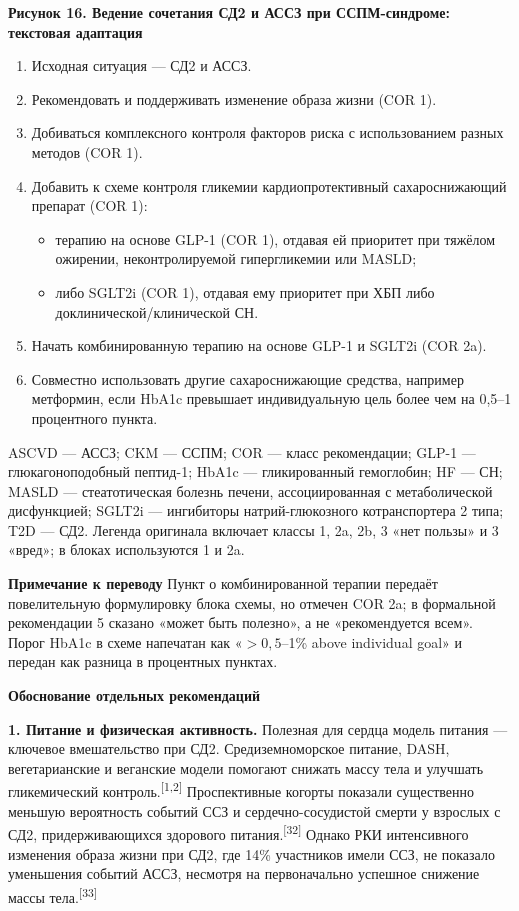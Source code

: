 \documentclass[11pt,a4paper]{article}
\newcommand{\src}[1]{\textsuperscript{[#1]}}
\newcommand{\editorial}[1]{\par\begingroup\small\color{black!70}\textbf{Примечание к переводу} #1\par\endgroup}
\newcommand{\heading}[1]{\par\medskip\textbf{#1}\par}
\begin{document}
\heading{Рисунок 16. Ведение сочетания СД2 и АССЗ при ССПМ-синдроме: текстовая адаптация}
\begin{enumerate}
\item Исходная ситуация --- СД2 и АССЗ.
\item Рекомендовать и поддерживать изменение образа жизни (COR 1).
\item Добиваться комплексного контроля факторов риска с использованием разных методов (COR 1).
\item Добавить к схеме контроля гликемии кардиопротективный сахароснижающий препарат (COR 1):
\begin{itemize}
\item терапию на основе GLP-1 (COR 1), отдавая ей приоритет при тяжёлом ожирении, неконтролируемой гипергликемии или MASLD;
\item либо SGLT2i (COR 1), отдавая ему приоритет при ХБП либо доклинической/клинической СН.
\end{itemize}
\item Начать комбинированную терапию на основе GLP-1 и SGLT2i (COR 2a).
\item Совместно использовать другие сахароснижающие средства, например метформин, если HbA1c превышает индивидуальную цель более чем на 0,5--1 процентного пункта.
\end{enumerate}
ASCVD --- АССЗ; CKM --- ССПМ; COR --- класс рекомендации; GLP-1 --- глюкагоноподобный пептид-1; HbA1c --- гликированный гемоглобин; HF --- СН; MASLD --- стеатотическая болезнь печени, ассоциированная с метаболической дисфункцией; SGLT2i --- ингибиторы натрий-глюкозного котранспортера 2 типа; T2D --- СД2. Легенда оригинала включает классы 1, 2a, 2b, 3 «нет пользы» и 3 «вред»; в блоках используются 1 и 2a.
\editorial{Пункт о комбинированной терапии передаёт повелительную формулировку блока схемы, но отмечен COR 2a; в формальной рекомендации 5 сказано «может быть полезно», а не «рекомендуется всем». Порог HbA1c в схеме напечатан как «$>0{,}5$--1\% above individual goal» и передан как разница в процентных пунктах.}

\heading{Обоснование отдельных рекомендаций}
\textbf{1. Питание и физическая активность.} Полезная для сердца модель питания --- ключевое вмешательство при СД2. Средиземноморское питание, DASH, вегетарианские и веганские модели помогают снижать массу тела и улучшать гликемический контроль.\src{1,2} Проспективные когорты показали существенно меньшую вероятность событий ССЗ и сердечно-сосудистой смерти у взрослых с СД2, придерживающихся здорового питания.\src{32} Однако РКИ интенсивного изменения образа жизни при СД2, где 14\% участников имели ССЗ, не показало уменьшения событий АССЗ, несмотря на первоначально успешное снижение массы тела.\src{33}
\end{document}
